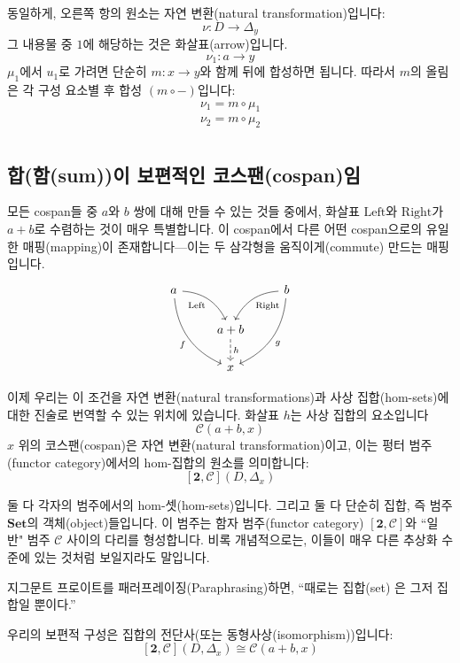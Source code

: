 \documentclass[DaoFP]{subfiles}
\begin{document}
동일하게, 오른쪽 항의 원소는 자연 변환(natural transformation)입니다:
\[ \nu \colon D \to \Delta_{y} \]
그 내용물 중 $1$에 해당하는 것은 화살표(arrow)입니다.
\[ \nu_1 \colon a \to y \]
$\mu_1$에서 $u_1$로 가려면 단순히 $m \colon x \to y$와 함께 뒤에 합성하면 됩니다. 따라서 $m$의 올림은 각 구성 요소별 후 합성 $(m \circ -)$입니다:
\begin{align*}
\nu_1 = m \circ \mu_1 \\
\nu_2 = m \circ \mu_2 \\
\end{align*}

\subsection{합(함(sum))이 보편적인 코스팬(cospan)임}

모든 cospan들 중 $a$와 $b$ 쌍에 대해 만들 수 있는 것들 중에서, 화살표 $\text{Left}$와 $\text{Right}$가 $a + b$로 수렴하는 것이 매우 특별합니다. 이 cospan에서 다른 어떤 cospan으로의 유일한 매핑(mapping)이 존재합니다---이는 두 삼각형을 움직이게(commute) 만드는 매핑입니다.
\[
 \begin{tikzcd}
 a
 \arrow[dr,  bend left, "\text{Left}"']
 \arrow[ddr, bend right, "f"']
 && b
 \arrow[dl, bend right, "\text{Right}"]
 \arrow[ddl, bend left, "g"]
 \\
&a + b
\arrow[d, dashed, "h"]
\\
& x
 \end{tikzcd}
\]

이제 우리는 이 조건을 자연 변환(natural transformations)과 사상 집합(hom-sets)에 대한 진술로 번역할 수 있는 위치에 있습니다. 화살표 $h$는 사상 집합의 요소입니다
\[ \mathcal{C}(a + b, x)\]
$x$ 위의 코스팬(cospan)은 자연 변환(natural transformation)이고, 이는 펑터 범주(functor category)에서의 hom-집합의 원소를 의미합니다:
\[ [\mathbf{2}, \mathcal{C}](D, \Delta_x) \]

둘 다 각자의 범주에서의 hom-셋(hom-sets)입니다. 그리고 둘 다 단순히 집합, 즉 범주 $\mathbf{Set}$의 객체(object)들입니다. 이 범주는 함자 범주(functor category) $[\mathbf{2}, \mathcal{C}]$와 ``일반" 범주 $\mathcal{C}$ 사이의 다리를 형성합니다. 비록 개념적으로는, 이들이 매우 다른 추상화 수준에 있는 것처럼 보일지라도 말입니다.

지그문트 프로이트를 패러프레이징(Paraphrasing)하면, ``때로는 집합(set) 은 그저 집합일 뿐이다.''

우리의 보편적 구성은 집합의 전단사(또는 동형사상(isomorphism))입니다:
\[ [\mathbf{2}, \mathcal{C}](D, \Delta_x)  \cong \mathcal{C}(a + b, x) \]
\end{document}
